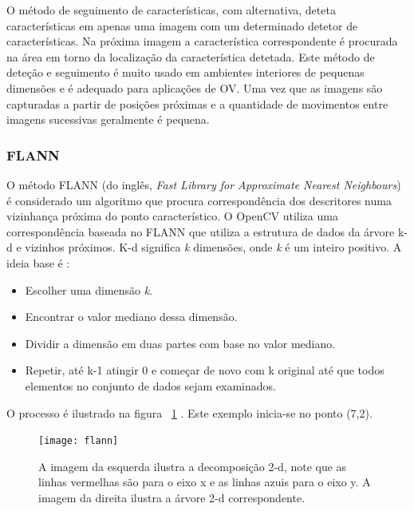 O método de seguimento de características, com alternativa, deteta características em apenas uma imagem com um determinado detetor de características. Na próxima imagem a característica correspondente é procurada na área em torno da localização da característica detetada.
Este método de deteção e seguimento é muito usado em ambientes interiores de pequenas dimensões e é adequado para aplicações de OV. 
Uma vez que as imagens são capturadas a partir de posições próximas e a quantidade de movimentos entre imagens sucessivas geralmente é pequena. 

\subsubsection{FLANN}\label{subchap:FLANN}

O método FLANN (do inglês, \textit{Fast Library for Approximate Nearest Neighbours}) é considerado um algoritmo que procura correspondência dos descritores numa vizinhança próxima do ponto característico.  O OpenCV utiliza uma correspondência baseada no FLANN que utiliza a estrutura de dados da árvore k-d e vizinhos próximos. K-d significa \textit{k} dimensões, onde \textit{k} é um inteiro positivo. A ideia base é :
\begin{itemize}
	\item Escolher uma dimensão \textit{k}.
	\item Encontrar o valor mediano dessa dimensão.
	\item Dividir a dimensão em duas partes com base no valor mediano.
	\item Repetir, até k-1 atingir 0 e começar de novo com k original até que todos elementos no conjunto de dados sejam examinados.
\end{itemize}

O processo é ilustrado na figura ~\ref{fig:flann} . Este exemplo inicia-se no ponto (7,2).

\begin{figure}[h!] %
	\begin{center}
		\leavevmode		
		\texttt{[image: flann]}
		\caption{A imagem da esquerda ilustra a decomposição 2-d, note que as linhas vermelhas são para o eixo x e as linhas azuis para o eixo y. A imagem da direita ilustra a árvore 2-d correspondente.}
		\label{fig:flann}
	\end{center}
\end{figure}


